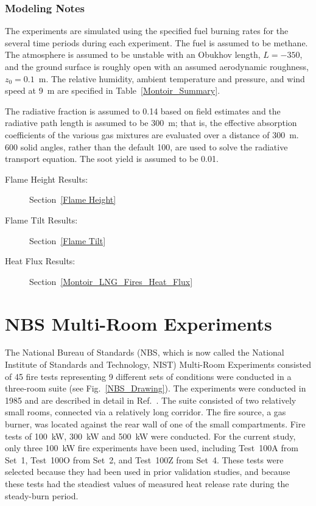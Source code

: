 \subsubsection{Modeling Notes}

The experiments are simulated using the specified fuel burning rates for the several time periods during each experiment. The fuel is assumed to be methane. The atmosphere is assumed to be unstable with an Obukhov length, $L=-350$, and the ground surface is roughly open with an assumed aerodynamic roughness, $z_0=0.1$~m. The relative humidity, ambient temperature and pressure, and wind speed at 9~m are specified in Table~\ref{Montoir_Summary}. 

The radiative fraction is assumed to 0.14 based on field estimates and the radiative path length is assumed to be 300~m; that is, the effective absorption coefficients of the various gas mixtures are evaluated over a distance of 300~m. 600 solid angles, rather than the default 100, are used to solve the radiative transport equation. The soot yield is assumed to be 0.01.

\begin{description}
\item[Flame Height Results:] Section~\ref{Flame Height}
\item[Flame Tilt Results:] Section~\ref{Flame Tilt}
\item[Heat Flux Results:] Section~\ref{Montoir_LNG_Fires_Heat_Flux}
\end{description}

\FloatBarrier


\section{NBS Multi-Room Experiments}
\label{NBS_Multi-Room_Description}

The National Bureau of Standards (NBS, which is now called the National Institute of Standards and Technology, NIST) Multi-Room Experiments consisted of 45 fire tests representing 9 different sets of conditions were conducted in a three-room suite (see Fig.~\ref{NBS_Drawing}). The experiments were conducted in 1985 and are described in detail in Ref.~\cite{Peacock:NBS_Multi-Room}. The suite consisted of two relatively small rooms, connected via a relatively long corridor. The fire source, a gas burner, was located against the rear wall of one of the small compartments.  Fire tests of 100~kW, 300~kW and 500~kW were conducted. For the current study, only three 100~kW fire experiments have been used, including Test~100A from Set~1, Test~100O from Set~2, and Test~100Z from Set~4. These tests were selected because they had been used in prior validation studies, and because these tests had the steadiest values of measured heat release rate during the steady-burn period.

